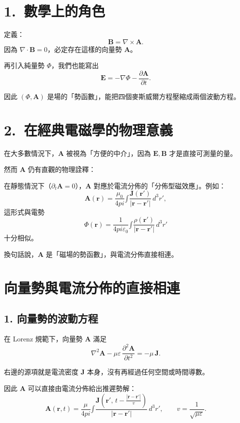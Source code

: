 \documentclass{article}
\def\pi{pi}%
\def\int{\text{∫}}%
\begin{document}
\section*{1.~數學上的角色}

定義：
\[
\mathbf{B} = \nabla \times \mathbf{A}.
\]
因為
\(\nabla\cdot \mathbf{B} = 0\)，必定存在這樣的向量勢 \(\mathbf{A}\)。

再引入純量勢 \(\Phi\)，我們也能寫出
\[
\mathbf{E} = -\nabla \Phi - \frac{\partial \mathbf{A}}{\partial t}.
\]

因此 \((\Phi,\mathbf{A})\) 是場的「勢函數」，能把四個麥斯威爾方程壓縮成兩個波動方程。

\section*{2.~在經典電磁學的物理意義}

在大多數情況下，\(\mathbf{A}\) 被視為「方便的中介」，因為 \(\mathbf{E},\mathbf{B}\) 才是直接可測量的量。

然而 \(\mathbf{A}\) 仍有直觀的物理詮釋：

在靜態情況下（\(\partial_t \mathbf{A} = 0\)），\(\mathbf{A}\) 對應於電流分佈的「分佈型磁效應」。例如：
\[
\mathbf{A}(\mathbf{r}) = \frac{\mu_0}{4\pi} \int \frac{\mathbf{J}(\mathbf{r}')}{|\mathbf{r}-\mathbf{r}'|}\,d^3r',
\]
這形式與電勢
\[
\Phi(\mathbf{r}) = \frac{1}{4\pi\varepsilon_0} \int \frac{\rho(\mathbf{r}')}{|\mathbf{r}-\mathbf{r}'|}\,d^3r'
\]
十分相似。

換句話說，\(\mathbf{A}\) 是「磁場的勢函數」，與電流分佈直接相連。

\section*{向量勢與電流分佈的直接相連}

\subsection*{1. 向量勢的波動方程}

在 Lorenz 規範下，向量勢 $\mathbf{A}$ 滿足
\begin{equation}
\nabla^{2}\mathbf{A} - \mu\varepsilon\,\frac{\partial^{2}\mathbf{A}}{\partial t^{2}}
= -\mu\,\mathbf{J}.
\label{eq:Awave}
\end{equation}

右邊的源項就是電流密度 $\mathbf{J}$ 本身，沒有再經過任何空間或時間導數。

因此 $\mathbf{A}$ 可以直接由電流分佈給出推遲勢解：
\begin{equation}
\mathbf{A}(\mathbf{r},t)
= \frac{\mu}{4\pi}\int \frac{\mathbf{J}\!\left(\mathbf{r}',\,t-\tfrac{|\mathbf{r}-\mathbf{r}'|}{v}\right)}
{|\mathbf{r}-\mathbf{r}'|}\,d^3r', \qquad v=\frac{1}{\sqrt{\mu\varepsilon}}.
\end{equation}
\end{document}
